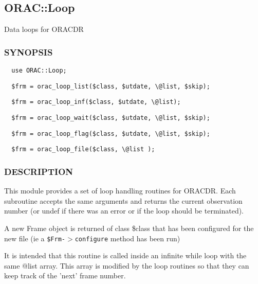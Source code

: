 \subsection{ORAC::Loop\label{ORAC::Loop}}

Data loops for ORACDR

\subsubsection*{SYNOPSIS\label{ORAC::Loop_SYNOPSIS}}\begin{verbatim}
  use ORAC::Loop;
\end{verbatim}
\begin{verbatim}
  $frm = orac_loop_list($class, $utdate, \@list, $skip);
\end{verbatim}
\begin{verbatim}
  $frm = orac_loop_inf($class, $utdate, \@list);
\end{verbatim}
\begin{verbatim}
  $frm = orac_loop_wait($class, $utdate, \@list, $skip);
\end{verbatim}
\begin{verbatim}
  $frm = orac_loop_flag($class, $utdate, \@list, $skip);
\end{verbatim}
\begin{verbatim}
  $frm = orac_loop_file($class, \@list );
\end{verbatim}
\subsubsection*{DESCRIPTION\label{ORAC::Loop_DESCRIPTION}}

This module provides a set of loop handling routines for ORACDR.
Each subroutine accepts the same arguments and returns the current
observation number (or undef if there was an error or if the loop
should be terminated).



A new  Frame object is returned of class \$class that has been configured
for the new file (ie a \texttt{\$Frm-$>$configure} method has been run)



It is intended that this routine is called inside an infinite while
loop with the same @list array. This array is modified by the loop
routines so that they can keep track of the 'next' frame number.



